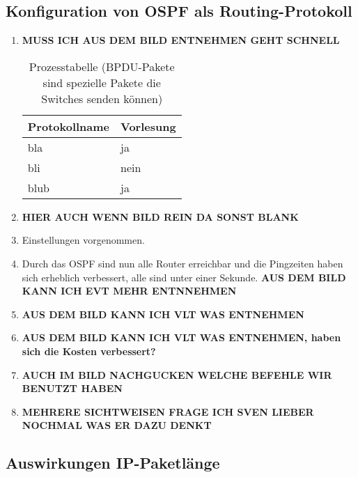 \documentclass{scrartcl}
\begin{document}
   \subsection[Augabe 6 Konfiguration von OSPF als Routing-Protokoll]{Konfiguration von OSPF als Routing-Protokoll}
   
    \renewcommand{\labelenumi}{\alph{enumi})}
    \begin{enumerate}
    \item
    \textbf{MUSS ICH AUS DEM BILD ENTNEHMEN GEHT SCHNELL}
    
    \begin{table}
  \begin{tabular}{|l|l}
      \textbf{Protokollname} & \textbf{Vorlesung} \\ \hline
		 bla  & ja \\
		 bli  & nein \\
		 blub  & ja 
    \end{tabular}
     \caption{Prozesstabelle (BPDU-Pakete sind spezielle Pakete die Switches senden können)}
    \end{table}
    
    \item
    \textbf{HIER AUCH WENN BILD REIN DA SONST BLANK}
    
    \item
    Einstellungen vorgenommen.
    
    \item
    Durch das OSPF sind nun alle Router erreichbar und die Pingzeiten haben sich erheblich verbessert, alle sind unter einer Sekunde. 
    \textbf{AUS DEM BILD KANN ICH EVT MEHR ENTNNEHMEN}
    
    \item
    \textbf{AUS DEM BILD KANN ICH VLT WAS ENTNEHMEN}
    
    \item
    \textbf{AUS DEM BILD KANN ICH VLT WAS ENTNEHMEN, haben sich die Kosten verbessert?}
    
    \item
    \textbf{AUCH IM BILD NACHGUCKEN WELCHE BEFEHLE WIR BENUTZT HABEN}
    
    \item
    \textbf{MEHRERE SICHTWEISEN FRAGE ICH SVEN LIEBER NOCHMAL WAS ER DAZU DENKT }

    \end{enumerate}

  \subsection[Aufgabe 7 Auswirkungen IP-Paketlänge]{Auswirkungen IP-Paketlänge}
  
\end{document}
